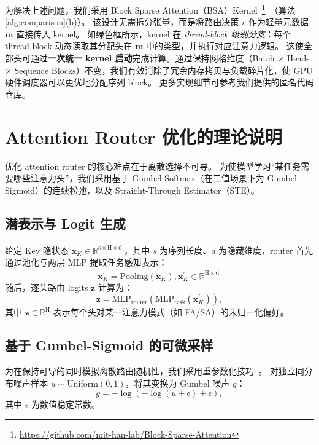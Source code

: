 为解决上述问题，我们采用 Block Sparse Attention（BSA）Kernel~\footnote{\url{https://github.com/mit-han-lab/Block-Sparse-Attention}}~\citep{guo2024blocksparse}（算法 \ref{alg:comparison}(b)）。
该设计无需拆分张量，而是将路由决策 $r$ 作为轻量元数据 $\mathbf{m}$ 直接传入 kernel。
如绿色框所示，kernel 在 \textit{thread-block 级别分支}：每个 thread block 动态读取其分配头在 $\mathbf{m}$ 中的类型，并执行对应注意力逻辑。
这使全部头可通过\textbf{一次统一 kernel 启动}完成计算。通过保持网格维度（Batch $\times$ Heads $\times$ Sequence Blocks）不变，我们有效消除了冗余内存拷贝与负载碎片化，使 GPU 硬件调度器可以更优地分配序列 block。
更多实现细节可参考我们提供的匿名代码仓库。




\section{Attention Router 优化的理论说明}
\label{appdix:theoretical_explan_attn_router}

优化 attention router 的核心难点在于离散选择不可导。
为使模型学习“某任务需要哪些注意力头”，我们采用基于 Gumbel-Softmax（在二值场景下为 Gumbel-Sigmoid）的连续松弛，以及 Straight-Through Estimator（STE）。

\subsection{潜表示与 Logit 生成}
给定 Key 隐状态 $\boldsymbol{x}_K \in \mathbb{R}^{\mathrm{s \times H \times d^{\prime}}}$，其中 $s$ 为序列长度、$d$ 为隐藏维度，router 首先通过池化与两层 MLP 提取任务感知表示：
\begin{equation}
\boldsymbol{x}_K^{\prime} = \text{Pooling}(\boldsymbol{x}_K), \boldsymbol{x}_K^{\prime} \in \mathbb{R}^{\mathrm{H \times d^{\prime}}}
\end{equation}
随后，逐头路由 logits $\mathbf{z}$ 计算为：
\begin{equation}
\mathbf{z} = \text{MLP}_{\text{router}}(\text{MLP}_{\text{task}}(\boldsymbol{x}_K^{\prime})),
\end{equation}
其中 $\mathbf{z} \in \mathbb{R}^\mathrm{H}$ 表示每个头对某一注意力模式（如 FA/SA）的未归一化偏好。

\subsection{基于 Gumbel-Sigmoid 的可微采样}
为在保持可导的同时模拟离散路由随机性，我们采用重参数化技巧~\citep{bhaskar2025cache}。
对独立同分布噪声样本 $u \sim \text{Uniform}(0, 1)$，将其变换为 Gumbel 噪声 $g$：
\begin{equation}
g = -\log(-\log(u + \epsilon) + \epsilon),
\end{equation}
其中 $\epsilon$ 为数值稳定常数。

